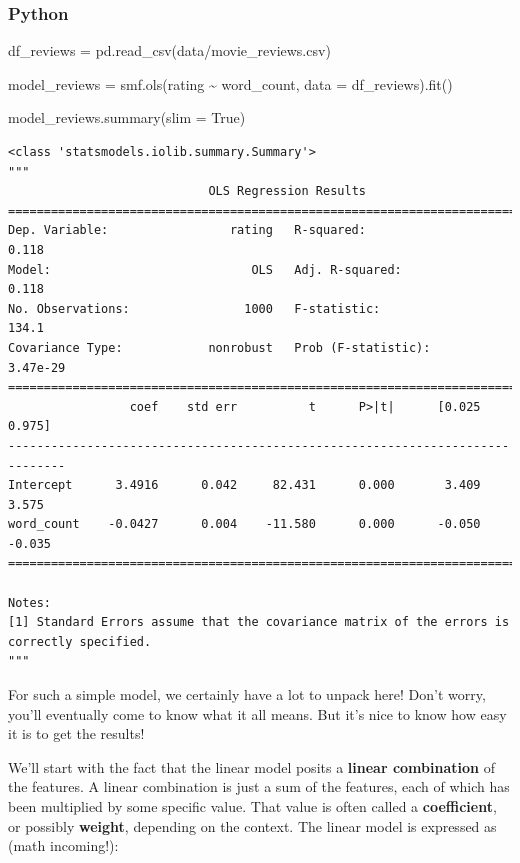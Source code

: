 \documentclass[
  letterpaper,
]{krantz}
\newenvironment{Shaded}{}{}
\newcommand{\NormalTok}[1]{#1}
\newcommand{\OperatorTok}[1]{\textcolor[rgb]{0.40,0.40,0.40}{#1}}
\newcommand{\StringTok}[1]{\textcolor[rgb]{0.25,0.44,0.63}{#1}}
\newcommand{\VariableTok}[1]{\textcolor[rgb]{0.10,0.09,0.49}{#1}}
\begin{document}
\subsubsection{Python}

\begin{Shaded}
\begin{Highlighting}[]
\NormalTok{df\_reviews }\OperatorTok{=}\NormalTok{ pd.read\_csv(}\StringTok{\textquotesingle{}data/movie\_reviews.csv\textquotesingle{}}\NormalTok{)}

\NormalTok{model\_reviews }\OperatorTok{=}\NormalTok{ smf.ols(}\StringTok{\textquotesingle{}rating \textasciitilde{} word\_count\textquotesingle{}}\NormalTok{, data }\OperatorTok{=}\NormalTok{ df\_reviews).fit()}

\NormalTok{model\_reviews.summary(slim }\OperatorTok{=} \VariableTok{True}\NormalTok{)}
\end{Highlighting}
\end{Shaded}

\begin{verbatim}
<class 'statsmodels.iolib.summary.Summary'>
"""
                            OLS Regression Results                            
==============================================================================
Dep. Variable:                 rating   R-squared:                       0.118
Model:                            OLS   Adj. R-squared:                  0.118
No. Observations:                1000   F-statistic:                     134.1
Covariance Type:            nonrobust   Prob (F-statistic):           3.47e-29
==============================================================================
                 coef    std err          t      P>|t|      [0.025      0.975]
------------------------------------------------------------------------------
Intercept      3.4916      0.042     82.431      0.000       3.409       3.575
word_count    -0.0427      0.004    -11.580      0.000      -0.050      -0.035
==============================================================================

Notes:
[1] Standard Errors assume that the covariance matrix of the errors is correctly specified.
"""
\end{verbatim}

For such a simple model, we certainly have a lot to unpack here! Don't
worry, you'll eventually come to know what it all means. But it's nice
to know how easy it is to get the results!

We'll start with the fact that the linear model posits a \textbf{linear
combination} of the features. A linear combination is just a sum of the
features, each of which has been multiplied by some specific value. That
value is often called a \textbf{coefficient}, or possibly
\textbf{weight}, depending on the context. The linear model is expressed
as (math incoming!):
\end{document}

